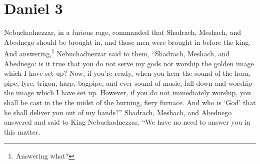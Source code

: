 \section{Daniel 3}\label{Daniel 3}
\begin{enumerate}
     Nebuchadnezzar, in a furious rage, commanded that Shadrach, Meshach, and Abednego should be brought in, and those men were brought in before the king.%
     And answering,\footnote{Answering what?} Nebuchadnezzar said to them, ``Shadrach, Meshach, and Abednego: is it true that you do not serve my gods nor worship the golden image which I have set up?%
     Now, if you're ready, when you hear the sound of the horn, pipe, lyre, trigon, harp, bagpipe, and ever sound of music, fall down and worship the image which I have set up. However, if you do not immediately worship, you shall be cast in the the midst of the burning, fiery furnace. And who is `God' that he shall deliver you out of my hands?''%
     Shadrach, Meshach, and Abednego answered and said to King Nebuchadnezzar, ``We have no need to answer you in this matter.%
\end{enumerate}
